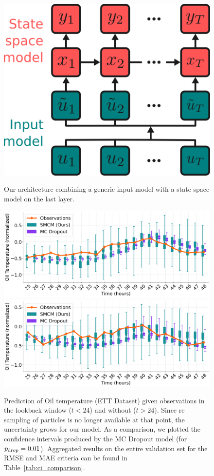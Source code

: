 \documentclass[journal]{IEEEtran}
\begin{document}
\begin{figure}[htpb]
	\centering
	\caption{Our architecture combining a generic input model with a state space model on the last layer.}
	\includegraphics[width=0.7\linewidth]{architecture.png}
	\label{fig:architecture}
\end{figure}

\begin{figure}[htpb]
	\centering
	\caption{Prediction of Oil temperature (ETT Dataset) given observations in the lookback window ($t<24$) and without ($t>24$).
		Since re sampling of particles is no longer available at that point, the uncertainty grows for our model.
		As a comparison, we plotted the confidence intervals produced by the MC Dropout model (for $p_\textnormal{drop}=0.01$).
		Aggregated results on the entire validation set for the RMSE and MAE criteria can be found in Table~\ref{tab:ci_comparison}.}
	\includegraphics[width=\linewidth]{filter_kp24_ett.png}
	\includegraphics[width=\linewidth]{filter_kp24_ett_2.png}
	\label{fig:filter_k+24}
\end{figure}
\end{document}
